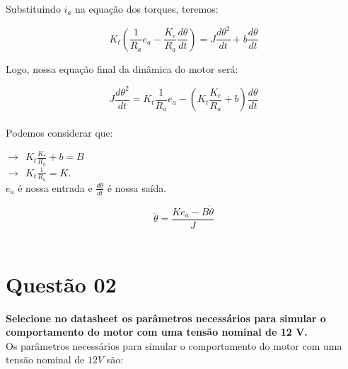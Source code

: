 \documentclass[a4paper, 12pt]{article}
\begin{document}
Substituindo $i_a$ na equação dos torques, teremos:

\begin{equation}
    K_t (\frac{1}{R_a}e_a - \frac{K_e}{R_a} \frac{d\theta}{dt}) = J \frac{d \theta^2}{dt} + b \frac{d\theta}{dt}
\end{equation}

Logo, nossa equação final da dinâmica do motor será:

\begin{equation}
   J \frac{d \theta^2}{dt} =  K_t \frac{1}{R_a}e_a - (K_t \frac{K_e}{R_a} + b) \frac{d\theta}{dt} 
\end{equation} \\

Podemos considerar que:

$\longrightarrow \>\ K_t \frac{K_e}{R_a} + b = B$ \\ 
$\longrightarrow \>\ K_t \frac{1}{R_a} = K$. \\
$e_a$ é nossa entrada e $\frac{d\theta}{dt}$ é nossa saída.

\begin{equation}
   \ddot \theta = \frac{K e_a - B \dot \theta}{J} 
\end{equation} \\


\newpage
\section{Questão 02}
\textbf{Selecione no datasheet os parâmetros necessários para simular o comportamento do motor com uma tensão nominal de 12 V.} \\

Os parâmetros necessários para simular o comportamento do motor com uma tensão nominal de $12V$ são:
\end{document}
